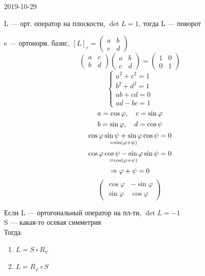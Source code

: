 \documentclass[main]{subfiles}
\begin{document}
  \begin{lect}{2019-10-29}
    \begin{definition}
      L --- орт. оператор на плоскости, $\det L = 1$, тогда L --- поворот
    \end{definition}

    e --- ортонорм. базис, $[L]_e = \begin{pmatrix}
      a & b\\
      c & d
    \end{pmatrix}$
    \[\begin{pmatrix}
      a & c\\
      b & d
    \end{pmatrix} \begin{pmatrix}
      a & b\\
      c & d
    \end{pmatrix} = \begin{pmatrix}
      1 & 0\\
      0 & 1
    \end{pmatrix}\]
    \[\begin{cases}
      a^2 + c^2 = 1\\
      b^2 + d^2 = 1\\
      ab + cd = 0\\
      ad - bc = 1
    \end{cases}\]
    \[a = \cos \varphi,\quad c = \sin \varphi\]
    \[b = \sin \varphi,\quad d = \cos \psi\]
    \[\underset{= \sin(\varphi + \psi)}{\cos \varphi \sin \psi + \sin \varphi \cos \psi} = 0\]
    \[\underset{= \cos(\varphi + \psi)}{\cos \varphi \cos \psi - \sin \varphi \sin \psi} = 0\]
    \[\Rightarrow \varphi + \psi = 0\]
    \[\begin{pmatrix}
      \cos \varphi & - \sin \varphi\\
      \sin \varphi & \cos \varphi
    \end{pmatrix}\]

    \begin{definition}
      Если L --- ортогональный оператор на пл-ти, $\det L = -1$\\
      S --- какая-то осевая симметрия\\
      Тогда:
      \begin{enumerate}
        \item $L = S \circ R_{\psi}$
        \item $L = R_{\varphi} \circ S$
      \end{enumerate}
    \end{definition}


\end{lect}
\end{document}
